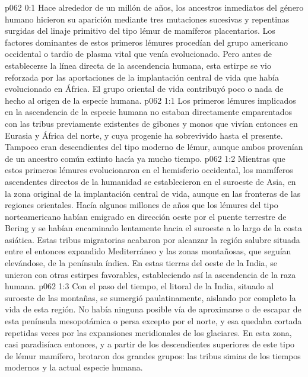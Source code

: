 \author{Portador de vida}
\vs p062 0:1 Hace alrededor de un millón de años, los ancestros inmediatos del género humano hicieron su aparición mediante tres mutaciones sucesivas y repentinas surgidas del linaje primitivo del tipo lémur de mamíferos placentarios. Los factores dominantes de estos primeros lémures procedían del grupo americano occidental o tardío de plasma vital que venía evolucionado. Pero antes de establecerse la línea directa de la ascendencia humana, esta estirpe se vio reforzada por las aportaciones de la implantación central de vida que había evolucionado en África. El grupo oriental de vida contribuyó poco o nada de hecho al origen de la especie humana.
\vs p062 1:1 Los primeros lémures implicados en la ascendencia de la especie humana no estaban directamente emparentados con las tribus previamente existentes de gibones y monos que vivían entonces en Eurasia y África del norte, y cuya progenie ha sobrevivido hasta el presente. Tampoco eran descendientes del tipo moderno de lémur, aunque ambos provenían de un ancestro común extinto hacía ya mucho tiempo.
\vs p062 1:2 Mientras que estos primeros lémures evolucionaron en el hemisferio occidental, los mamíferos ascendentes directos de la humanidad se establecieron en el suroeste de Asia, en la zona original de la implantación central de vida, aunque en las fronteras de las regiones orientales. Hacía algunos millones de años que los lémures del tipo norteamericano habían emigrado en dirección oeste por el puente terrestre de Bering y se habían encaminado lentamente hacia el suroeste a lo largo de la costa asiática. Estas tribus migratorias acabaron por alcanzar la región salubre situada entre el entonces expandido Mediterráneo y las zonas montañosas, que seguían elevándose, de la península índica. En estas tierras del oeste de la India, se unieron con otras estirpes favorables, estableciendo así la ascendencia de la raza humana.
\vs p062 1:3 Con el paso del tiempo, el litoral de la India, situado al suroeste de las montañas, se sumergió paulatinamente, aislando por completo la vida de esta región. No había ninguna posible vía de aproximarse o de escapar de esta península mesopotámica o persa excepto por el norte, y esa quedaba cortada repetidas veces por las expansiones meridionales de los glaciares. En esta zona, casi paradisíaca entonces, y a partir de los descendientes superiores de este tipo de lémur mamífero, brotaron dos grandes grupos: las tribus simias de los tiempos modernos y la actual especie humana.
